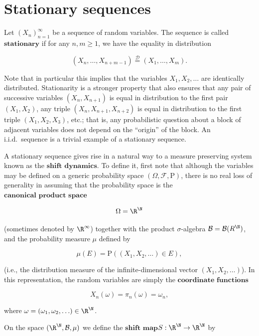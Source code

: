 \section{Stationary sequences}
\label{sec-stationary}
Let $(X_n)_{n=1}^\infty$ be a sequence of random
variables. The sequence is called
$\textbf{stationary}$ if for any $n,m\ge 1$, we have
the equality in distribution

\begin{equation*} \tag{14}\label{eq:def-stationary}
(X_n,\ldots,X_{n+m-1}) \stackrel{\mathcal{D}}{=} (X_1,\ldots,X_m).
\end{equation*}

\noindent Note that in particular this implies that the
variables $X_1,X_2,\ldots$ are identically
distributed. Stationarity is a stronger property that
also ensures that any pair of successive variables
$(X_n,X_{n+1})$ is equal in distribution to the first
pair $(X_1,X_2)$, any triple $(X_n,X_{n+1},X_{n+2})$
is equal in distribution to the first triple
$(X_1,X_2,X_3)$, etc.; that is, any probabilistic
question about a block of adjacent variables does not
depend on the ``origin'' of the block. An i.i.d.\
sequence is a trivial example of a stationary
sequence.

A stationary sequence gives rise in a natural way to
a measure preserving system known as the
$\textbf{shift dynamics}$. To define it, first note
that although the variables may be defined on a
generic probability space
$(\Omega, \mathcal{F},\mathrm{P})$, there is no real
loss of generality in assuming that the probability
space is the $\textbf{canonical product space}$

\[
\Omega = \R^\N
\]

\noindent (sometimes denoted by $\R^\infty$) together with the
product $\sigma$-algebra
$\mathcal{B}=\mathcal{B}(R^\N)$, and the probability
measure $\mu$ defined by

\[
\mu(E) = \mathrm{P}( (X_1,X_2,\ldots) \in E ),
\]

\noindent (i.e., the distribution measure of the
infinite-dimensional vector $(X_1,X_2,\ldots)$). In
this representation, the random variables are simply
the $\textbf{coordinate functions}$

\[
X_n(\omega) = \pi_n(\omega) = \omega_n,
\]

\noindent where $\omega=(\omega_1, \omega_2, \ldots) \in \R^\N$.

On the space $(\R^\N,\mathcal{B}, \mu)$ we define the
$\textbf{shift map}$$S:\R^\N\to\R^\N$ by

